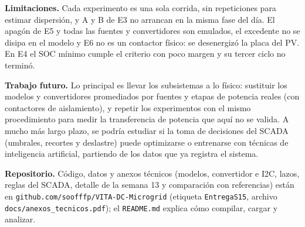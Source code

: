 \documentclass[conference]{IEEEtran}
\begin{document}
\textbf{Limitaciones.} Cada experimento es una sola corrida, sin repeticiones para estimar dispersión, y A y B de E3 no arrancan en la misma fase del día. El apagón de E5 y todas las fuentes y convertidores son emulados, el excedente no se disipa en el modelo y E6 no es un contactor físico: se desenergizó la placa del PV. En E4 el SOC mínimo cumple el criterio con poco margen y su tercer ciclo no terminó.

\textbf{Trabajo futuro.} Lo principal es llevar los subsistemas a lo físico: sustituir los modelos y convertidores promediados por fuentes y etapas de potencia reales (con contactores de aislamiento), y repetir los experimentos con el mismo procedimiento para medir la transferencia de potencia que aquí no se valida. A mucho más largo plazo, se podría estudiar si la toma de decisiones del SCADA (umbrales, recortes y deslastre) puede optimizarse o entrenarse con técnicas de inteligencia artificial, partiendo de los datos que ya registra el sistema.

\textbf{Repositorio.} Código, datos y anexos técnicos (modelos, convertidor e I2C, lazos, reglas del SCADA, detalle de la semana 13 y comparación con referencias) están en \texttt{github.com/soofffp/VITA-DC-Microgrid} (etiqueta \texttt{EntregaS15}, archivo \texttt{docs/anexos\_tecnicos.pdf}); el \texttt{README.md} explica cómo compilar, cargar y analizar.
\end{document}
